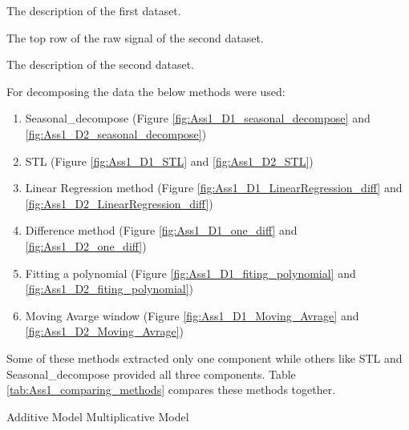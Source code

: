 \documentclass[12pt]{article}
\begin{document}
\begin{enumerate}
\begin{table}[H]
 \centering
\caption{The description of the first dataset.
{\label{tab:Ass1_D1_raw_signal_summary_statistics}}}

\end{table}

\begin{table}[H]
 \centering
\caption{The top row of the raw signal of the second dataset.
{\label{tab:Ass1_D2_raw_signal}}}

\end{table}

\begin{table}[H]
 \centering
\caption{The description of the second dataset.
{\label{tab:Ass1_D2_raw_signal_summary_statistics}}}

\end{table}

For decomposing the data the below methods were used:
    \begin{enumerate}
    \item Seasonal\_decompose (Figure
        \ref{fig:Ass1_D1_seasonal_decompose} and \ref{fig:Ass1_D2_seasonal_decompose})
        
    \item STL (Figure
        \ref{fig:Ass1_D1_STL} and \ref{fig:Ass1_D2_STL})
        
    \item Linear Regression method (Figure
        \ref{fig:Ass1_D1_LinearRegression_diff} and \ref{fig:Ass1_D2_LinearRegression_diff})
        
    \item Difference method (Figure
        \ref{fig:Ass1_D1_one_diff} and \ref{fig:Ass1_D2_one_diff})
        
    \item Fitting a polynomial (Figure
        \ref{fig:Ass1_D1_fiting_polynomial} and \ref{fig:Ass1_D2_fiting_polynomial})
        
    \item Moving Avarge window (Figure
        \ref{fig:Ass1_D1_Moving_Avrage} and \ref{fig:Ass1_D2_Moving_Avrage})

    \end{enumerate}
Some of these methods extracted only one component while others like STL and Seasonal\_decompose provided all three components. Table \ref{tab:Ass1_comparing_methods} compares these methods together.

Additive Model
Multiplicative Model


\end{enumerate}
\end{document}
